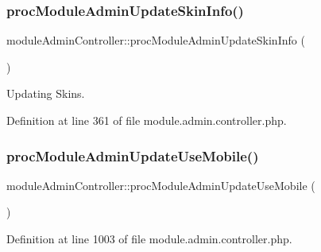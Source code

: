 \subsubsection{\texorpdfstring{proc\+Module\+Admin\+Update\+Skin\+Info()}{procModuleAdminUpdateSkinInfo()}}
{\footnotesize\ttfamily module\+Admin\+Controller\+::proc\+Module\+Admin\+Update\+Skin\+Info (\begin{DoxyParamCaption}{ }\end{DoxyParamCaption})}



Updating Skins. 



Definition at line 361 of file module.\+admin.\+controller.\+php.

\hypertarget{classmoduleAdminController_a70143beac165b7795868db95f0d4b4e6}{}\label{classmoduleAdminController_a70143beac165b7795868db95f0d4b4e6} 
\subsubsection{\texorpdfstring{proc\+Module\+Admin\+Update\+Use\+Mobile()}{procModuleAdminUpdateUseMobile()}}
{\footnotesize\ttfamily module\+Admin\+Controller\+::proc\+Module\+Admin\+Update\+Use\+Mobile (\begin{DoxyParamCaption}{ }\end{DoxyParamCaption})}



Definition at line 1003 of file module.\+admin.\+controller.\+php.

\hypertarget{classmoduleAdminController_a1ff90fe08fe1f3d67783ff81b91ee3b2}{}\label{classmoduleAdminController_a1ff90fe08fe1f3d67783ff81b91ee3b2} 
